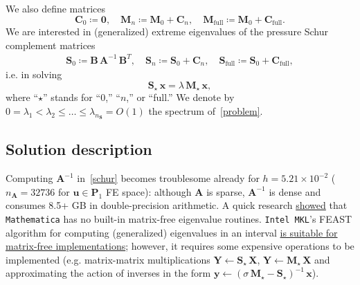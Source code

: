 \documentclass[12pt]{article}
\newcommand{\vect}[1]{\boldsymbol{\mathbf{#1}}}
\begin{document}
We also define matrices 
\begin{equation}
	\vect C_0 \coloneqq \vect 0,\quad
	\vect M_n \coloneqq \vect M_0 + \vect C_n,\quad
	\vect M_{\text{full}} \coloneqq \vect M_0 + \vect C_{\text{full}}.
\end{equation}
We are interested in (generalized) extreme eigenvalues of the pressure Schur complement matrices
\begin{align}\label{schur}
	\vect S_0 \coloneqq \vect B\,\vect A^{-1}\,\vect B^{T},\quad
	\vect S_n \coloneqq \vect S_0 + \vect C_n,\quad
	\vect S_{\text{full}} \coloneqq \vect S_0 + \vect C_{\text{full}},
\end{align}
i.e. in solving
\begin{equation}\label{problem}
	\vect S_\star\,\vect x = \lambda\,\vect M_\star\,\vect x,
\end{equation}
where ``$\star$'' stands for ``$0$,'' ``$n$,'' or ``full.'' We denote by~$0 = \lambda_1 < \lambda_2 \le \dots \le \lambda_{n_{\vect S}} = O(1)$ the spectrum of~\eqref{problem}.

\subsection{Solution description}

Computing $\vect A^{-1}$ in~\eqref{schur} becomes troublesome already for $h = 5.21\times10^{-2}$ ($n_{\vect A} = 32736$ for $\vect u \in \vect P_1$ FE space): although $\vect A$ is sparse, $\vect A^{-1}$ is dense and consumes 8.5+ GB in double-precision arithmetic. A quick research \href{https://mathematica.stackexchange.com/questions/189620/matrix-free-arnoldi-method-for-eigensystems}{showed} that \texttt{Mathematica} has no built-in matrix-free eigenvalue routines. \texttt{Intel MKL}'s FEAST algorithm for computing (generalized) eigenvalues in an interval \href{https://software.intel.com/sites/default/files/mkl-2019-developer-reference-c.pdf#_OPENTOPIC_TOC_PROCESSING_d62e853651}{is suitable for matrix-free implementations}; however, it requires some expensive operations to be implemented (e.g. matrix-matrix multiplications $\vect Y \leftarrow \vect S_\star\,\vect X$, $\vect Y \leftarrow \vect M_\star\,\vect X$ and approximating the action of inverses in the form $\vect y \leftarrow (\sigma\,\vect M_\star - \vect S_\star)^{-1}\,\vect x$).
\end{document}
